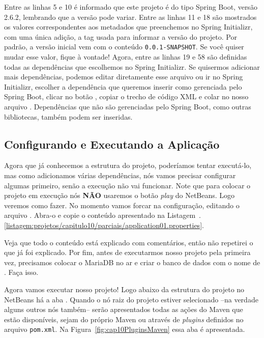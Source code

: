 Entre as linhas 5 e 10 é informado que este projeto é do tipo Spring Boot, versão 2.6.2, lembrando que a versão pode variar. Entre as linhas 11 e 18 são mostrados os valores correspondentes aos metadados que preenchemos no Spring Initializr, com uma única adição, a tag  usada para informar a versão do projeto. Por padrão, a versão inicial vem com o conteúdo \texttt{0.0.1-SNAPSHOT}. Se você quiser mudar esse valor, fique à vontade! Agora, entre as linhas 19 e 58 são definidas todas as dependências que escolhemos no Spring Initializr. Se quisermos adicionar mais dependências, podemos editar diretamente esse arquivo ou ir no Spring Initializr, escolher a dependência que queremos inserir como gerenciada pelo Spring Boot, clicar no botão , copiar o trecho de código XML e colar no nosso arquivo . Dependências que não são gerenciadas pelo Spring Boot, como outras bibliotecas, também podem ser inseridas.


\subsection{Configurando e Executando a Aplicação}

Agora que já conhecemos a estrutura do projeto, poderíamos tentar executá-lo, mas como adicionamos várias dependências, nós vamos precisar configurar algumas primeiro, senão a execução não vai funcionar. Note que para colocar o projeto em execução nós \textbf{NÃO} usaremos o botão \textit{play} do NetBeans. Logo veremos como fazer. No momento vamos forcar na configuração, editando o arquivo . Abra-o e copie o conteúdo apresentado na Listagem~\thechapter.\ref{listagem:projetos/capitulo10/parciais/application01.properties}.


Veja que todo o conteúdo está explicado com comentários, então não repetirei o que já foi explicado. Por fim, antes de executarmos nosso projeto pela primeira vez, precisamos colocar o MariaDB no ar e criar o banco de dados com o nome de . Faça isso.

Agora vamos executar nosso projeto! Logo abaixo da estrutura do projeto no NetBeans há a aba . Quando o nó raiz do projeto estiver selecionado --na verdade alguns outros nós também-- serão apresentados todas as ações do Maven que estão disponíveis, sejam do próprio Maven ou através de \textit{plugins} definidos no arquivo \texttt{pom.xml}. Na Figura~\ref{fig:cap10PluginsMaven} essa aba é apresentada.

